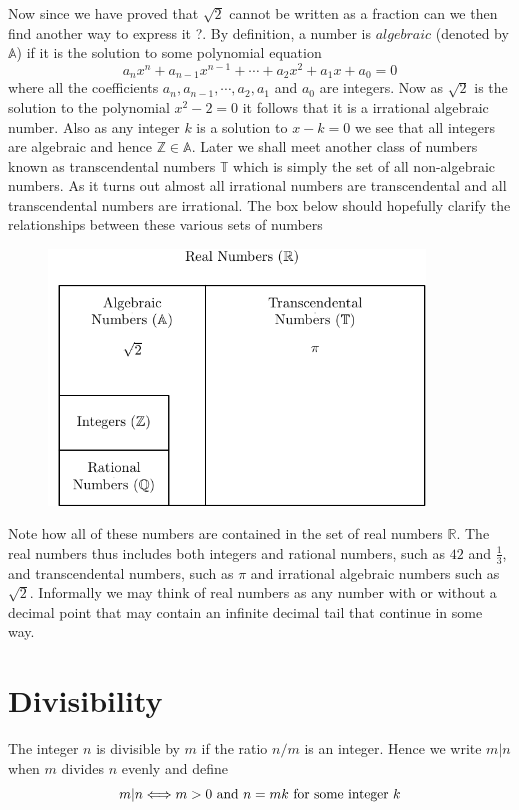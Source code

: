 \myindent Now since we have proved that $\sqrt{2}$ cannot be written as a
fraction can we then find another way to express it ?. By definition, a number
is $algebraic$ (denoted by $\mathbb{A}$) if it is the solution to some
polynomial equation
\[
a_{n}x^{n} + a_{n-1}x^{n-1} + \cdots + a_{2}x^{2} + a_{1}x + a_0 = 0
\]
where all the coefficients $a_n, a_{n-1}, \cdots, a_2, a_1$ and $a_0$ are
integers. Now as $\sqrt{2}$ is the solution to the polynomial $x^2 - 2 = 0$ it
follows that it is a irrational algebraic number. Also as any integer $k$ is a
solution to $x-k=0$ we see that all integers are algebraic and hence
$\mathbb{Z} \in \mathbb{A}$. Later we shall meet another class of numbers known
as transcendental numbers $\mathbb{T}$ which is simply the set of all
non-algebraic numbers. As it turns  out almost all irrational numbers are
transcendental and all transcendental numbers are irrational. The box below
should hopefully clarify the relationships between these various
sets of numbers
\begin{figure}[htb!]
\begin{center}
\includegraphics[width=10cm]{images/number_types.pdf}
\end{center}
\end{figure}
Note how all of these numbers are contained in the set of real numbers
$\mathbb{R}$. The real numbers thus includes both integers and rational numbers,
such as $42$ and $\frac{1}{3}$, and transcendental numbers, such as $\pi$ and
irrational algebraic numbers such as $\sqrt{2}$. Informally we may think of
real numbers as any number with or without a decimal point that may contain
an infinite decimal tail that continue in some way.

\section{Divisibility}
The integer $n$ is divisible by $m$ if the ratio $n/m$ is an integer. Hence we
write $m|n$ when $m$ divides $n$ evenly and define
\begin{equation}\label{divisibility}
m|n \Longleftrightarrow m > 0 \textnormal{ and } n = mk
\textnormal{ for some integer } k
\end{equation}

